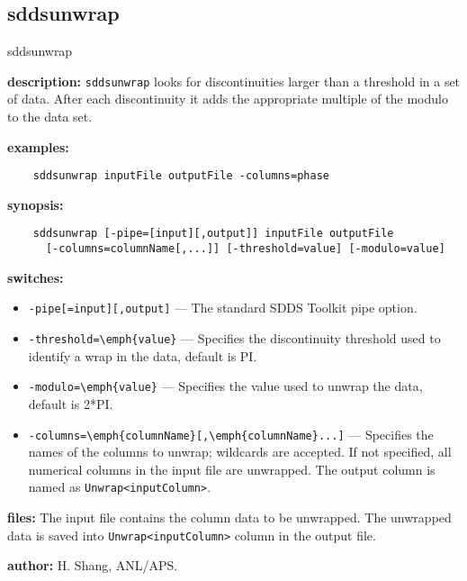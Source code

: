\newpage
\subsection{sddsunwrap}
\label{sddsunwrap}

\begin{sddsprog}{sddsunwrap}
  \item \textbf{description:}
    \verb|sddsunwrap| looks for discontinuities larger than a threshold in a set of data.
    After each discontinuity it adds the appropriate multiple of the modulo to the data set.
  \item \textbf{examples:}
    \begin{verbatim}
    sddsunwrap inputFile outputFile -columns=phase
    \end{verbatim}
  \item \textbf{synopsis:}
    \begin{verbatim}
    sddsunwrap [-pipe=[input][,output]] inputFile outputFile
      [-columns=columnName[,...]] [-threshold=value] [-modulo=value]
    \end{verbatim}
  \item \textbf{switches:}
    \begin{itemize}
      \item \verb|-pipe[=input][,output]| --- The standard SDDS Toolkit pipe option.
      \item \verb|-threshold=\emph{value}| --- Specifies the discontinuity threshold used to identify a wrap in the data, default is PI.
      \item \verb|-modulo=\emph{value}| --- Specifies the value used to unwrap the data, default is 2*PI.
      \item \verb|-columns=\emph{columnName}[,\emph{columnName}...]| --- Specifies the names of the columns to unwrap; wildcards are accepted. If not specified, all numerical columns in the input file are unwrapped. The output column is named as \verb|Unwrap<inputColumn>|.
    \end{itemize}
  \item \textbf{files:}
    The input file contains the column data to be unwrapped. The unwrapped data is saved into \verb|Unwrap<inputColumn>| column in the output file.
  \item \textbf{author:} H. Shang, ANL/APS.
\end{sddsprog}

